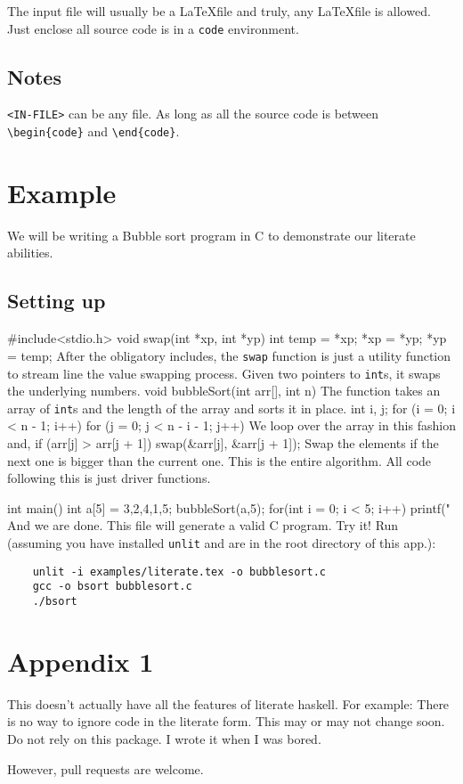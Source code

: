 \documentclass{article}
\newenvironment{code}{\footnotesize\verbatim}{\endverbatim\normalsize}
\begin{document}
The input file will usually be a \LaTeX  file and truly, any \LaTeX  file is allowed. Just enclose all source code is in a \verb|code| environment.

\subsection{Notes}
\verb|<IN-FILE>| can be any file. As long as all the source code is between \\
\verb|\begin{code}| and \verb|\end{code}|.

\section{Example}
We will be writing a Bubble sort program in C to demonstrate our literate abilities.

\subsection{Setting up}
\begin{code}
    #include<stdio.h>
    void swap(int *xp, int *yp) {
            int temp = *xp;
            *xp = *yp;
            *yp = temp;
        }
\end{code}
After the obligatory includes, the \verb|swap| function is just a utility function to stream line the value swapping process. Given two pointers to \verb|int|s, it swaps the underlying numbers.
\begin{code}
    void bubbleSort(int arr[], int n) {
\end{code}
The function takes an array of \verb|int|s and the length of the array and sorts it in place.
\begin{code}
    int i, j;
    for (i = 0; i < n - 1; i++)
    for (j = 0; j < n - i - 1; j++)
\end{code}
We loop over the array in this fashion and,
\begin{code}
    if (arr[j] > arr[j + 1])
    swap(&arr[j], &arr[j + 1]);
\end{code}
Swap the elements if the next one is bigger than the current one.
\begin{code}
    }
\end{code}
This is the entire algorithm. All code following this is just driver functions.

\begin{code}
    int main(){
            int a[5] = {3,2,4,1,5};
            bubbleSort(a,5);
            for(int i = 0; i < 5; i++){
                    printf("%
                }
        }
\end{code}
And we are done. This file will generate a valid C program. Try it! Run (assuming you have installed \verb|unlit| and are in the root directory of this app.):
\begin{verbatim}
    unlit -i examples/literate.tex -o bubblesort.c
    gcc -o bsort bubblesort.c
    ./bsort
\end{verbatim}
\section*{Appendix 1}
This doesn't actually have all the features of literate haskell. For example: There is no way to ignore code in the literate form. This may or may not change soon. Do not rely on this package. I wrote it when I was bored. 

However, pull requests are welcome.
\end{document}
